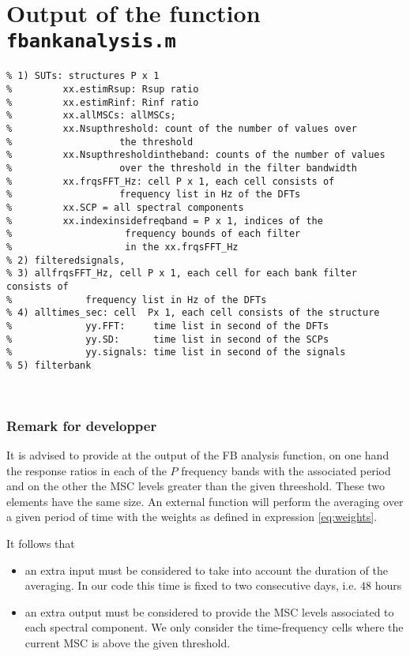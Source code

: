 \newpage\clearpage
\section{Output of the function {\tt fbankanalysis.m}}

\begin{verbatim}
% 1) SUTs: structures P x 1
%         xx.estimRsup: Rsup ratio
%         xx.estimRinf: Rinf ratio
%         xx.allMSCs: allMSCs;
%         xx.Nsupthreshold: count of the number of values over
%                   the threshold
%         xx.Nsupthresholdintheband: counts of the number of values
%                   over the threshold in the filter bandwidth
%         xx.frqsFFT_Hz: cell P x 1, each cell consists of
%                   frequency list in Hz of the DFTs
%         xx.SCP = all spectral components
%         xx.indexinsidefreqband = P x 1, indices of the
%                    frequency bounds of each filter
%                    in the xx.frqsFFT_Hz
% 2) filteredsignals, 
% 3) allfrqsFFT_Hz, cell P x 1, each cell for each bank filter consists of
%             frequency list in Hz of the DFTs
% 4) alltimes_sec: cell  Px 1, each cell consists of the structure
%             yy.FFT:     time list in second of the DFTs
%             yy.SD:      time list in second of the SCPs
%             yy.signals: time list in second of the signals
% 5) filterbank



\end{verbatim}


\subsubsection{Remark for developper}

It is advised to provide at the output of the FB analysis function, on one hand the response ratios in each of the $P$ frequency bands  with the associated period and on the other the MSC levels greater than the given threeshold. These two elements have the same size. An external function will perform the averaging over a given period of time with the weights as defined in expression \ref{eq:weights}.

It follows that 
\begin{itemize}
\item
 an extra input must be considered to take into account the duration of the averaging. In our code this time is fixed to two consecutive days, i.e. $48$ hours
\item
 an extra output must be considered to provide the MSC levels associated to each spectral component. We only consider the time-frequency cells where the current MSC is above the given threshold.

\end{itemize}

